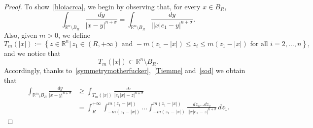 \documentclass[12pt]{article}
\newcommand{\R}{\mathbb{R}}
\numberwithin{equation}{section}
\renewcommand{\leq}{\leqslant}
\renewcommand{\geq}{\geqslant}
\begin{document}
\begin{appendix}
\begin{proof}
To show~\eqref{hloiacrca}, we begin by observing that, for every $x\in B_R$,
\begin{equation}\label{symmetrymotherfucker}
\int_{\R^n\setminus B_R} \frac{dy}{\left|x-y\right|^{n+\sigma}}= \int_{\R^n\setminus B_R} \frac{dy}{\left|\left|x\right|e_1-y\right|^{n+\sigma}}.  
\end{equation}
Also, given $m>0$, we define
\begin{equation}\label{Tiemme}
T_m(\left|x\right|):=\left\lbrace z\in\R^n|\, z_1\in (R,+\infty) \mbox{  and  }  -m  (z_1-\left|x\right|)\leq z_{i} \leq m (z_1-\left|x\right|) \mbox{  for all  }i=2,\dots,n\right\rbrace,     
\end{equation}
and we notice that
\begin{equation}\label{sod}
T_m(\left|x\right|)\subset \R^{n}\setminus B_R.     
\end{equation}
Accordingly, thanks to~\eqref{symmetrymotherfucker},~\eqref{Tiemme} and~\eqref{sod} we obtain that 
\begin{equation*}
\begin{split}
\int_{\R^n\setminus B_R} \frac{dy}{\left|x-y\right|^{n+\sigma}}&\geq \int_{T_m(\left|x\right|)}\frac{dz}{\left|e_1\left|x\right|-z\right|^{n+\sigma}}\\
&= \int_{R}^{+\infty}\int_{-m(z_1-\left|x\right|)}^{m(z_1-\left|x\right|)}\dots\int_{-m(z_1-\left|x\right|)}^{m(z_1-\left|x\right|)}\frac{dz_{n}\dots d z_2}{\left|\left|x\right|e_1-z\right|^{n+\sigma}}\,dz_1.
\end{split}
\end{equation*}


\end{proof}
\end{appendix}
\end{document}
